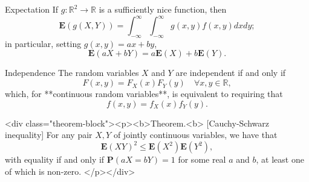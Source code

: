 \begin{newnotion}{Expectation}
If $g: \mathbb{R}^2 \to \mathbb{R}$ is a sufficiently nice function, then 
$$\begin{equation}
    \mathbf{E}(g(X, Y))=\int_{-\infty}^{\infty} \int_{-\infty}^{\infty} g(x, y) f(x, y) d x d y;
\end{equation}$$
in particular, setting $g(x, y) = ax + by$, 
$$\begin{equation}
    \mathbf{E}(aX+bY) = a\mathbf{E}(X) + b\mathbf{E}(Y).
\end{equation}$$
\end{newnotion}

\begin{newnotion}{Independence}
The random variables $X$ and $Y$ are independent if and only if 
$$\begin{equation}
    F(x,y) = F_X(x) F_Y(y) \quad \forall x, y \in \mathbb{R},
\end{equation}$$
which, for **continuous random variables**, is equivalent to requiring that 
$$\begin{equation}
    f(x,y) = f_X(x) f_Y(y).
\end{equation}$$
\end{newnotion}
 
<div class="theorem-block"><p><b>Theorem.<b> [Cauchy-Schwarz inequality] For any pair $X, Y$ of jointly continuous variables, we have that 
$$\begin{equation}
    \mathbf{E}(XY)^2 \leq \mathbf{E}(X^2) \mathbf{E}(Y^2), 
\end{equation}$$
with equality if and only if $\mathbf{P}(aX = bY) = 1$ for some real $a$ and $b$, at least one of which is non-zero. 
</p></div>


